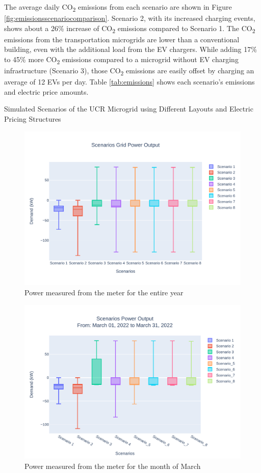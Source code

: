 \documentclass[conference]{IEEEtran}
\begin{document}
		The average daily CO\textsubscript{2} emissions from each scenario are shown in Figure \ref{fig:emissionsscenariocomparison}. Scenario 2, with its increased charging events, shows about a 26\% increase of CO\textsubscript{2} emissions compared to Scenario 1. The CO\textsubscript{2} emissions from the transportation microgrids are lower than a conventional building, even with the additional load from the EV chargers. While adding 17\% to 45\% more CO\textsubscript{2} emissions compared to a microgrid without EV charging infrastructure (Scenario 3), those CO\textsubscript{2} emissions are easily offset by charging an average of 12 EVs per day. Table \ref{tab:emissions} shows each scenario's emissions and electric price amounts.
	\begin{table}
		\caption{Simulated Scenarios of the UCR Microgrid using Different Layouts and Electric Pricing Structures}
		\tiny
		
		\normalsize
		\label{tab:scenarios}
	\end{table}
	\begin{figure}
		\centering
		\includegraphics[width=0.9\linewidth]{Fig/scenarios_power_output_boxplot}
		\caption{Power measured from the meter for the entire year}
		\label{fig:scenariospoweroutputboxplot}
	\end{figure}
	\begin{figure}
		\centering
		\includegraphics[width=1\linewidth]{Fig/0_Scn_Output_Run_3_Mar_01_2022_to_Mar_31_2022}
		\caption{Power measured from the meter for the month of March}
		\label{fig:0scnoutputrun2mar012022tomar312022}
	\end{figure}
\end{document}
